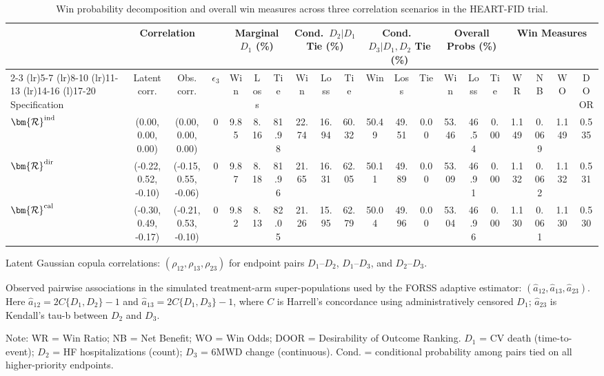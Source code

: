 \begin{landscape}
\begin{table}
\centering
\caption{Win probability decomposition and overall win measures across three correlation scenarios in the HEART-FID trial.}
\label{tab:heartfid_combined_scenarios}
\begin{threeparttable}
\setlength{\tabcolsep}{3.0pt}
\renewcommand{\arraystretch}{1.08}
\footnotesize
\begin{tabular}{@{}l c c c ccc ccc ccc ccc cccc@{}}
\toprule
& \multicolumn{2}{c}{Correlation} & & \multicolumn{3}{c}{\textbf{Marginal $D_1$ (\%)}} & \multicolumn{3}{c}{\textbf{Cond.\ $D_2|D_1$ Tie (\%)}} & \multicolumn{3}{c}{\textbf{Cond.\ $D_3|D_1,D_2$ Tie (\%)}} & \multicolumn{3}{c}{\textbf{Overall Probs (\%)}} & \multicolumn{4}{c}{\textbf{Win Measures}} \\
\cmidrule(lr){2-3} \cmidrule(lr){5-7} \cmidrule(lr){8-10} \cmidrule(lr){11-13} \cmidrule(lr){14-16} \cmidrule(l){17-20}
Specification & Latent corr.\tnote{a} & Obs. corr.\tnote{b} & $\epsilon_3$ & Win & Loss & Tie & Win & Loss & Tie & Win & Loss & Tie & Win & Loss & Tie & WR & NB & WO & DOOR \\
\midrule
$\bm{\mathcal R}^{\textup{ind}}$ & (0.00, 0.00, 0.00) & (0.00, 0.00, 0.00) & 0 & 9.85 & 8.16 & 81.98 & 22.74 & 16.94 & 60.32 & 50.49 & 49.51 & 0.00 & 53.46 & 46.54 & 0.00 & 1.149 & 0.069 & 1.149 & 0.535 \\
$\bm{\mathcal R}^{\textup{dir}}$ & (-0.22, 0.52, -0.10) & (-0.15, 0.55, -0.06) & 0 & 9.87 & 8.18 & 81.96 & 21.65 & 16.31 & 62.05 & 50.11 & 49.89 & 0.00 & 53.09 & 46.91 & 0.00 & 1.132 & 0.062 & 1.132 & 0.531 \\
$\bm{\mathcal R}^{\textup{cal}}$ & (-0.30, 0.49, -0.17) & (-0.21, 0.53, -0.10) & 0 & 9.82 & 8.13 & 82.05 & 21.26 & 15.95 & 62.79 & 50.04 & 49.96 & 0.00 & 53.04 & 46.96 & 0.00 & 1.130 & 0.061 & 1.130 & 0.530 \\
\bottomrule
\end{tabular}
\begin{tablenotes}\footnotesize
\item[a] Latent Gaussian copula correlations: $(\rho_{12}, \rho_{13}, \rho_{23})$ for endpoint pairs $D_1$--$D_2$, $D_1$--$D_3$, and $D_2$--$D_3$.
\item[b] Observed pairwise associations in the simulated treatment-arm super-populations used by the FORSS adaptive estimator: $(\hat{a}_{12}, \hat{a}_{13}, \hat{a}_{23})$. Here $\hat{a}_{12}=2C\{D_1,D_2\}-1$ and $\hat{a}_{13}=2C\{D_1,D_3\}-1$, where $C$ is Harrell's concordance using administratively censored $D_1$; $\hat{a}_{23}$ is Kendall's tau-b between $D_2$ and $D_3$.
\item Note: WR = Win Ratio; NB = Net Benefit; WO = Win Odds; DOOR = Desirability of Outcome Ranking. $D_1$ = CV death (time-to-event); $D_2$ = HF hospitalizations (count); $D_3$ = 6MWD change (continuous). Cond. = conditional probability among pairs tied on all higher-priority endpoints.
\end{tablenotes}
\end{threeparttable}
\end{table}
\end{landscape}
